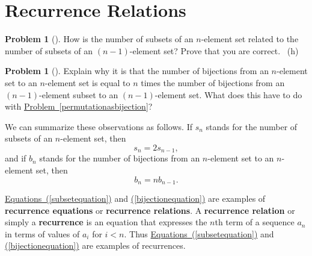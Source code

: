 \documentclass[10pt,]{book}
\newcommand{\terminology}[1]{\textbf{#1}}
\theoremstyle{plain}
\theoremstyle{definition}
\newtheorem{activity}[project]{Problem}
\theoremstyle{definition}
\numberwithin{equation}{chapter}
\newcommand{\lt}{<}
\begin{document}
\typeout{************************************************}
\typeout{************************************************}
\section[{Recurrence Relations}]{Recurrence Relations}\label{sec_induction-recurrence}
\begin{activity}[]\marginsymbol[-1em]{} \label{activity-87}
\hypertarget{p-539}{}%
How is the number of subsets of an \(n\)-element set related to the number of subsets of an \((n - 1)\)-element set? Prove that you are correct.%
~{\tiny (h)}\end{activity}
\begin{activity}[]\marginsymbol[-1em]{} \label{activity-88}
\hypertarget{p-542}{}%
Explain why it is that the number of bijections from an \(n\)-element set to an \(n\)-element set is equal to \(n\) times the number of bijections from an \((n-1)\)-element subset to an \((n-1)\)-element set. What does this have to do with \hyperref[permutationasbijection]{Problem~\ref{permutationasbijection}}?%
\end{activity}
\hypertarget{p-544}{}%
We can summarize these observations as follows. If \(s_n\) stands for the number of subsets of an \(n\)-element set, then%
\begin{equation}
s_n =2s_{n-1},\label{subsetequation}
\end{equation}
and if \(b_n\) stands for the number of bijections from an \(n\)-element set to an \(n\)-element set, then%
\begin{equation}
b_n =
nb_{n-1}.\label{bijectionequation}
\end{equation}
%
\par
\hypertarget{p-545}{}%
\hyperref[subsetequation]{Equations~(\ref{subsetequation})} and \hyperref[bijectionequation]{(\ref{bijectionequation})} are examples of \terminology{recurrence equations} or \terminology{recurrence relations}. A \terminology{recurrence relation} or simply a \terminology{recurrence} is an equation that expresses the \(n\)th term of a sequence \(a_n\) in terms of values of \(a_i\) for \(i\lt n\). Thus \hyperref[subsetequation]{Equations~(\ref{subsetequation})} and \hyperref[bijectionequation]{(\ref{bijectionequation})} are examples of recurrences.%
\typeout{************************************************}
\typeout{************************************************}
\end{document}
